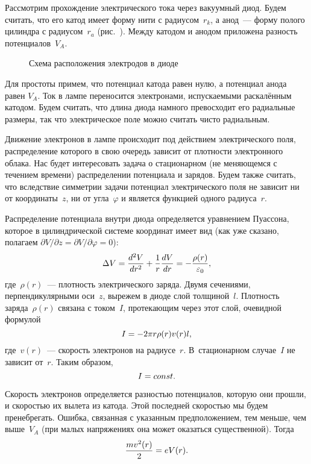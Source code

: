 Рассмотрим прохождение электрического тока через вакуумный диод. Будем считать,
что его катод имеет форму нити с
радиусом~$r_k$, а анод~--- форму полого цилиндра с радиусом~$r_a$
(рис.~). Между катодом и анодом приложена разность
потенциалов~$V_A$.
\begin{figure}[h!]
	\caption{Схема расположения электродов в диоде}
\end{figure}

Для простоты примем, что потенциал катода равен нулю, а потенциал анода равен
$V_A$. Ток в лампе переносится
электронами, испускаемыми раскалённым катодом. Будем считать, что длина диода
намного превосходит его радиальные
размеры, так что электрическое поле можно считать чисто радиальным.

Движение электронов в лампе происходит под действием электрического поля,
распределение которого в свою очередь зависит от плотности электронного облака.
Нас будет интересовать задача о стационарном (не меняющемся с течением времени)
распределении потенциала и зарядов. Будем также считать, что вследствие
симметрии задачи потенциал электрического поля не зависит ни от координаты~$z$,
ни от угла~$\varphi$ и является функцией одного радиуса~$r$.

Распределение потенциала внутри диода определяется уравнением Пуассона, которое
в цилиндрической системе координат имеет вид (как уже сказано, полагаем
$\partial V/\partial z=\partial V/\partial\varphi=0$):
\begin{equation}
	\Delta V=\frac{d^2 V}{dr^2}+\frac{1}{r}\frac{dV}{dr}=-
    \frac{\rho(r)}{\varepsilon_0},
	\eqmark{3.2.1}
\end{equation}
где~$\rho(r)$~--- плотность электрического заряда. Двумя сечениями,
перпендикулярными оси~$z$, вырежем в диоде слой
толщиной~$l$. Плотность заряда~$\rho(r)$ связана с током~$I$, протекающим через
этот слой, очевидной формулой
\begin{equation}
	I=-2\pi r\rho(r)v(r)l,
	\eqmark{3.2.2}
\end{equation}
где~$v(r)$~--- скорость электронов на радиусе~$r$. В~стационарном случае~$I$ не
зависит от~$r$. Таким образом,
\begin{equation}
	I=const.
	\eqmark{3.2.3}
\end{equation}

Скорость электронов определяется разностью потенциалов, которую они прошли, и
скоростью их вылета из катода. Этой
последней скоростью мы будем пренебрегать. Ошибка, связанная с указанным
предположением, тем меньше, чем выше~$V_A$ (при малых напряжениях она может
оказаться существенной). Тогда
\begin{equation}
	\frac{mv^2(r)}{2}=eV(r).
	\eqmark{3.2.4}
\end{equation}

